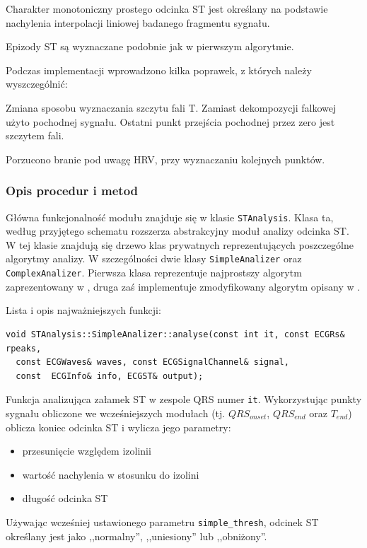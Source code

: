 \documentclass[a4paper, 11pt]{article}
\begin{document}
Charakter monotoniczny prostego odcinka ST jest określany na podstawie
nachylenia interpolacji liniowej badanego fragmentu sygnału.

Epizody ST są wyznaczane podobnie jak w pierwszym algorytmie.

Podczas implementacji wprowadzono kilka poprawek, z których należy
wyszczególnić:

Zmiana sposobu wyznaczania szczytu fali T. Zamiast dekompozycji falkowej użyto
pochodnej sygnału. Ostatni punkt przejścia pochodnej przez zero jest szczytem
fali.

Porzucono branie pod uwagę HRV, przy wyznaczaniu kolejnych punktów.
\subsubsection{Opis procedur i metod}
\label{sec:st_interval:procs}

Główna funkcjonalność modułu znajduje się w klasie \verb|STAnalysis|. Klasa ta,
według przyjętego schematu rozszerza abstrakcyjny moduł analizy odcinka ST. W
tej klasie znajdują się drzewo klas prywatnych reprezentujących poszczególne
algorytmy analizy. W szczególności dwie klasy \verb|SimpleAnalizer| oraz
\verb|ComplexAnalizer|. Pierwsza klasa reprezentuje najprostszy algorytm
zaprezentowany w \cite[p.~155]{AUGUST1}, druga zaś implementuje zmodyfikowany
algorytm opisany w \cite{SHEN1}.

Lista i opis najważniejszych funkcji:

\begin{lstlisting}
void STAnalysis::SimpleAnalizer::analyse(const int it, const ECGRs& rpeaks,
  const ECGWaves& waves, const ECGSignalChannel& signal,
  const  ECGInfo& info, ECGST& output);
\end{lstlisting}

Funkcja analizująca załamek ST w zespole QRS numer \verb|it|. Wykorzystując
punkty sygnału obliczone we wcześniejszych modułach (tj. $QRS_{onset}$,
$QRS_{end}$ oraz $T_{end}$) oblicza koniec odcinka ST i wylicza jego parametry:
\begin{itemize}
  \item przesunięcie względem izolinii
  \item wartość nachylenia w stosunku do izolini
  \item długość odcinka ST
\end{itemize}
Używając wcześniej ustawionego parametru \verb|simple_thresh|, odcinek ST
określany jest jako ,,normalny'', ,,uniesiony'' lub ,,obniżony''.
\end{document}
